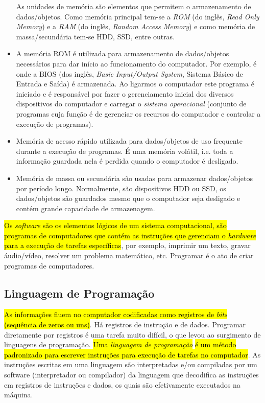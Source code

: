 \begin{itemize}
  As unidades de memória são elementos que permitem o armazenamento de dados/objetos. Como memória principal tem-se a \emph{ROM} (do inglês, \textit{Read Only Memory}) e a \emph{RAM} (do inglês, \textit{Random Access Memory}) e como memória de massa/secundária tem-se HDD, SSD, entre outras.

\item {}

  A memória ROM é utilizada para armazenamento de dados/objetos necessários para dar início ao funcionamento do computador. Por exemplo, é onde a BIOS (dos inglês, \textit{Basic Input/Output System}, Sistema Básico de Entrada e Saída) é armazenada. Ao ligarmos o computador este programa é iniciado e é responsável por fazer o gerenciamento inicial dos diversos dispositivos do computador e carregar o \emph{sistema operacional} (conjunto de programas cuja função é de gerenciar os recursos do computador e controlar a execução de programas).

\item {}

  Memória de acesso rápido utilizada para dados/objetos de uso frequente durante a execução de programas. É uma memória volátil, i.e. toda a informação guardada nela é perdida quando o computador é desligado.

\item {}

  Memória de massa ou secundária são usadas para armazenar dados/objetos por período longo. Normalmente, são dispositivos HDD ou SSD, os dados/objetos são guardados mesmo que o computador seja desligado e contém grande capacidade de armazenagem.   
\end{itemize}

\hl{Os \emph{software} são os elementos lógicos de um sistema computacional, são programas de computadores que contém as instruções que gerenciam o \emph{hardware} para a execução de tarefas específicas}, por exemplo, imprimir um texto, gravar áudio/vídeo, resolver um problema matemático, etc. Programar é o ato de criar programas de computadores.

\subsection{Linguagem de Programação}

\hl{As informações fluem no computador codificadas como registros de \textit{bits}}\hl{ (sequência de zeros ou uns)}. Há registros de instrução e de dados. Programar diretamente por registros é uma tarefa muito difícil, o que levou ao surgimento de linguagens de programação. \hl{Uma \emph{linguagem de programação}}\hl{ é um método padronizado para escrever instruções para execução de tarefas no computador}. As instruções escritas em uma linguagem são interpretadas e/ou compiladas por um software (interpretador ou compilador) da linguagem que decodifica as instruções em registros de instruções e dados, os quais são efetivamente executados na máquina.

